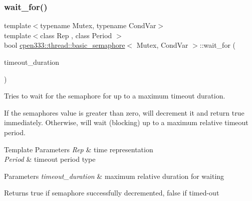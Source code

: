 \subsubsection{\texorpdfstring{wait\+\_\+for()}{wait\_for()}}
{\footnotesize\ttfamily template$<$typename Mutex, typename Cond\+Var$>$ \\
template$<$class Rep , class Period $>$ \\
bool \hyperlink{classcpen333_1_1thread_1_1basic__semaphore}{cpen333\+::thread\+::basic\+\_\+semaphore}$<$ Mutex, Cond\+Var $>$\+::wait\+\_\+for (\begin{DoxyParamCaption}\item[{const std\+::chrono\+::duration$<$ Rep, Period $>$ \&}]{timeout\+\_\+duration }\end{DoxyParamCaption})\hspace{0.3cm}{\ttfamily [inline]}}



Tries to wait for the semaphore for up to a maximum timeout duration. 

If the semaphore\textquotesingle{}s value is greater than zero, will decrement it and return true immediately. Otherwise, will wait (blocking) up to a maximum relative timeout period.


\begin{DoxyTemplParams}{Template Parameters}
{\em Rep} & time representation \\
\hline
{\em Period} & timeout period type \\
\hline
\end{DoxyTemplParams}

\begin{DoxyParams}{Parameters}
{\em timeout\+\_\+duration} & maximum relative duration for waiting \\
\hline
\end{DoxyParams}
\begin{DoxyReturn}{Returns}
true if semaphore successfully decremented, false if timed-\/out 
\end{DoxyReturn}
\mbox{\label{classcpen333_1_1thread_1_1basic__semaphore_a19d3b188f86c565acbf83ec4872d9773}} 
